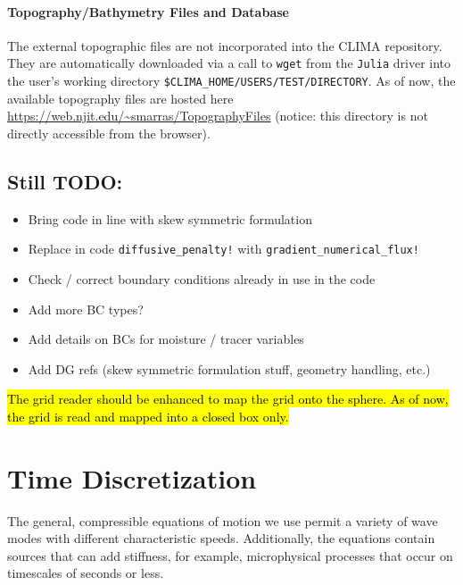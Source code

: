 \documentclass{report}
\numberwithin{equation}{section}
\begin{document}

\subsubsection{Topography/Bathymetry Files and Database}
The external topographic files are not incorporated into the CLIMA repository. 
They are automatically downloaded via a call to {\tt wget} from the {\tt Julia} driver into the user's working directory {\tt \$CLIMA\_HOME/USERS/TEST/DIRECTORY}. As of now, the available topography files are hosted here \url{https://web.njit.edu/~smarras/TopographyFiles} (notice: this directory is not directly accessible from the browser).


\section{Still TODO:}
\begin{itemize}
  \item Bring code in line with skew symmetric formulation
  \item Replace in code \texttt{diffusive\_penalty!} with
    \texttt{gradient\_numerical\_flux!}
  \item Check / correct boundary conditions already in use in the code
  \item Add more BC types?
  \item Add details on BCs for moisture / tracer variables
  \item Add DG refs (skew symmetric formulation stuff, geometry handling, etc.)
\end{itemize}

\hl{The grid reader should be enhanced to map the grid onto the sphere. As of now, the grid is read and mapped into a closed box only.}


\chapter{Time Discretization}\label{s:timestepping}

The general, compressible equations of motion we use permit a variety of wave modes with different characteristic speeds. Additionally, the equations contain sources that can add stiffness, for example, microphysical processes that occur on timescales of seconds or less.
\end{document}
